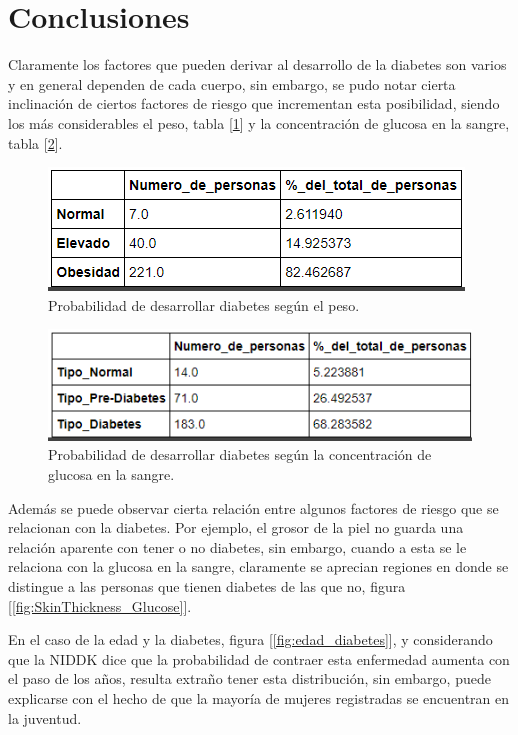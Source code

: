 \documentclass{article}
\begin{document}
\section{Conclusiones}

Claramente los factores que pueden derivar al desarrollo de la diabetes son varios y en general dependen de cada cuerpo, sin embargo, se pudo notar cierta inclinación de ciertos factores de riesgo que incrementan esta posibilidad, siendo los más considerables el peso, tabla [\ref{fig:porc_peso}] y la concentración de glucosa en la sangre, tabla [\ref{fig:porc_glucosa}].

\begin{figure}[H]
	\centering
	\includegraphics[width=0.9\linewidth]{porc_peso.png}
	\caption{Probabilidad de desarrollar diabetes según el peso.}%
	\label{fig:porc_peso}
\end{figure}

\begin{figure}[H]
	\centering
	\includegraphics[width=0.9\linewidth]{gluc.png}
	\caption{Probabilidad de desarrollar diabetes según la concentración de glucosa en la sangre.}%
	\label{fig:porc_glucosa}
\end{figure}

Además se puede observar cierta relación entre algunos factores de riesgo que se relacionan con la diabetes. Por ejemplo, el grosor de la piel no guarda una relación aparente con tener o no diabetes, sin embargo, cuando a esta se le relaciona con la glucosa en la sangre, claramente se aprecian regiones en donde se distingue a las personas que tienen diabetes de las que no, figura [\ref{fig:SkinThickness_Glucose}].

En el caso de la edad y la diabetes, figura [\ref{fig:edad_diabetes}], y considerando que la NIDDK \cite{diausa} dice que la probabilidad de contraer esta enfermedad aumenta con el paso de los años, resulta extraño tener esta distribución, sin embargo, puede explicarse con el hecho de que la mayoría de mujeres registradas se encuentran en la juventud.
\end{document}
